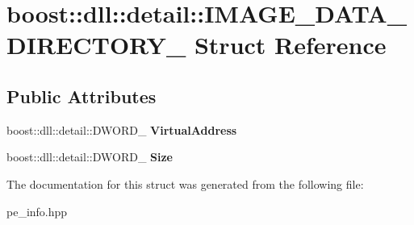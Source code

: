 \hypertarget{a00144}{}\section{boost\+:\+:dll\+:\+:detail\+:\+:I\+M\+A\+G\+E\+\_\+\+D\+A\+T\+A\+\_\+\+D\+I\+R\+E\+C\+T\+O\+R\+Y\+\_\+ Struct Reference}
\label{a00144}
\subsection*{Public Attributes}
\begin{DoxyCompactItemize}
\item 
boost\+::dll\+::detail\+::\+D\+W\+O\+R\+D\+\_\+ {\bfseries Virtual\+Address}\hypertarget{a00144_a340957aec7b2353ade198ca79186141e}{}\label{a00144_a340957aec7b2353ade198ca79186141e}

\item 
boost\+::dll\+::detail\+::\+D\+W\+O\+R\+D\+\_\+ {\bfseries Size}\hypertarget{a00144_a713c3c47477c9d0f55009f8dcfa1bcd0}{}\label{a00144_a713c3c47477c9d0f55009f8dcfa1bcd0}

\end{DoxyCompactItemize}


The documentation for this struct was generated from the following file\+:\begin{DoxyCompactItemize}
\item 
pe\+\_\+info.\+hpp\end{DoxyCompactItemize}
